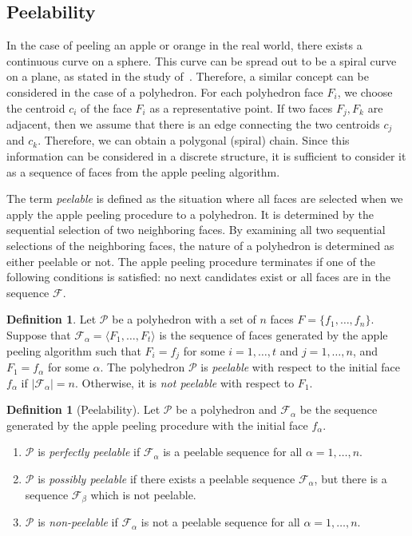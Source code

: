 \documentclass[12pt]{article}
\theoremstyle{plain}
\theoremstyle{definition}
\newtheorem{definition}[theorem]{Definition}
\theoremstyle{remark}
\begin{document}
\subsection{Peelability}

In the case of peeling an apple or orange in the real world, there exists
a continuous curve on a sphere.
This curve can be spread out to be a spiral curve on a plane, as stated
in the study of~\cite{Bartholdi2012}.
Therefore, a similar concept can be considered in the case of a polyhedron.
For each polyhedron face $F_i$, we choose the centroid $c_i$ of the face
$F_i$ as a representative point.
If two faces $F_j, F_k$ are adjacent, then we assume that there is an
edge connecting the two centroids $c_j$ and $c_k$.
Therefore, we can obtain a polygonal (spiral) chain.
Since this information can be considered in a discrete structure, it is
sufficient to consider it as a sequence of faces from the apple peeling
algorithm.

The term \emph{peelable} is defined as the situation where all faces are
selected when we apply the apple peeling procedure to a polyhedron.
It is determined by the sequential selection of two neighboring faces.
By examining all two sequential selections of the neighboring faces, the
nature of a polyhedron is determined as either peelable or not.
The apple peeling procedure terminates if one of the following conditions
is satisfied: no next candidates exist or all faces are in the sequence
$\mathcal{F}$.

\begin{definition}
Let $\mathcal{P}$ be a polyhedron with a set of $n$ faces
$F=\{f_1, \ldots, f_n\}$.
Suppose that $\mathcal{F}_{\alpha}=\langle F_1, \ldots, F_t\rangle$ is
the sequence of faces generated by the apple peeling algorithm such that
$F_i = f_j$ for some $i=1, \ldots, t$ and $j=1, \ldots, n$, and
$F_1 = f_{\alpha}$ for some $\alpha$.
The polyhedron $\mathcal{P}$ is \emph{peelable} with respect to the
initial face $f_{\alpha}$ if $|\mathcal{F}_{\alpha}|=n$.
Otherwise, it is \emph{not peelable} with respect to $F_1$.
\end{definition}

\begin{definition}[Peelability]
Let $\mathcal{P}$ be a polyhedron and $\mathcal{F}_{\alpha}$ be the
sequence generated by the apple peeling procedure with the initial face
$f_{\alpha}$.
\begin{enumerate}
  \item $\mathcal{P}$ is \emph{perfectly peelable} if
        $\mathcal{F}_{\alpha}$ is a peelable sequence for all
        $\alpha=1, \ldots, n$.
  \item $\mathcal{P}$ is \emph{possibly peelable} if there exists a
        peelable sequence $\mathcal{F}_{\alpha}$, but there is a sequence
        $\mathcal{F}_{\beta}$ which is not peelable.
  \item $\mathcal{P}$ is \emph{non-peelable} if $\mathcal{F}_{\alpha}$
        is not a peelable sequence for all $\alpha=1, \ldots, n$.
\end{enumerate}
\end{definition}
\end{document}
